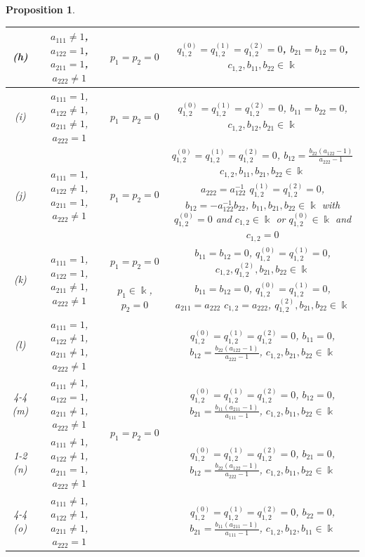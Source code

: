 \documentclass{amsart}
\newtheorem{proposition}[theorem]{Proposition}
\theoremstyle{definition}
\theoremstyle{remark}
\numberwithin{equation}{section}
\begin{document}
\begin{proposition}
\begin{table}[h]
\begin{center}
{\begin{tabular}{ |c|c|c|c| }
\hline
{\rm (h)} & $a_{111}\not =1$, $a_{122}=1$, $a_{211}=1$, $a_{222}\not=1$ & $p_1=p_2=0$ & $q_{1,2}^{(0)}=q_{1,2}^{(1)}=q_{1,2}^{(2)}=0$, $b_{21}=b_{12}=0$, $c_{1,2}, b_{11}, b_{22}\in\Bbbk$ \\
\hline
{\rm (i)} & $a_{111} =1$, $a_{122}\not=1$, $a_{211}\not=1$, $a_{222}=1$ & $p_1=p_2=0$ & $q_{1,2}^{(0)}=q_{1,2}^{(1)}=q_{1,2}^{(2)}=0$, $b_{11}=b_{22}=0$, $c_{1,2}, b_{12}, b_{21}\in\Bbbk$ \\
\hline
\multirow{2}{*}{{\rm (j)}} & \multirow{2}{*}{$a_{111} =1$, $a_{122}\not=1$, $a_{211}=1$, $a_{222}\not=1$} & \multirow{2}{*}{$p_1=p_2=0$} & $q_{1,2}^{(0)}=q_{1,2}^{(1)}=q_{1,2}^{(2)}=0$, $b_{12}=\frac{b_{22}(a_{122}-1)}{a_{222}-1}$ $c_{1,2}, b_{11}, b_{21}, b_{22}\in\Bbbk$ \\ \cline{4-4}
&  &  & $a_{222}=a_{122}^{-1}$ $q_{1,2}^{(1)}=q_{1,2}^{(2)}=0$, $b_{12}=-a_{122}^{-1}b_{22}$, $b_{11}, b_{21}, b_{22}\in\Bbbk$ with $q_{1,2}^{(0)}=0$ and $c_{1,2}\in\Bbbk$ or $q_{1,2}^{(0)}\in\Bbbk$ and $c_{1,2}=0$ \\   
\hline
\multirow{2}{*}{{\rm (k)}} & \multirow{2}{*}{$a_{111} =1$, $a_{122}=1$, $a_{211}\not=1$, $a_{222}\not=1$} & $p_1=p_2=0$ & $b_{11}=b_{12}=0$, $q_{1,2}^{(0)}=q_{1,2}^{(1)}=0$, $c_{1,2}, q_{1,2}^{(2)}, b_{21}, b_{22}\in\Bbbk$ \\ \cline{3-4}
&  & $p_1\in \Bbbk$, $p_2=0$ & $b_{11}=b_{12}=0$, $q_{1,2}^{(0)}=q_{1,2}^{(1)}=0$, $a_{211}=a_{222}$ $c_{1,2}=a_{222}$, $q_{1,2}^{(2)}, b_{21}, b_{22}\in\Bbbk$ \\   
\hline
{\rm (l)} & $a_{111} =1$, $a_{122}\not=1$, $a_{211}\not=1$, $a_{222}\not=1$ & \multirow{4}{*}{$p_1=p_2=0$} &  $q_{1,2}^{(0)}=q_{1,2}^{(1)}=q_{1,2}^{(2)}=0$, $b_{11}=0$, $b_{12}=\frac{b_{22}(a_{122}-1)}{a_{222}-1}$, $c_{1,2},  b_{21}, b_{22}\in\Bbbk$ \\ \cline{4-4} \cline{1-2}
{\rm (m)} & $a_{111} \not=1$, $a_{122}=1$, $a_{211}\not=1$, $a_{222}\not=1$ &  & $q_{1,2}^{(0)}=q_{1,2}^{(1)}=q_{1,2}^{(2)}=0$, $b_{12}=0$, $b_{21}=\frac{b_{11}(a_{211}-1)}{a_{111}-1}$, $c_{1,2},  b_{11}, b_{22}\in\Bbbk$ \\ \cline{1-2}  \cline{4-4}
{\rm (n)} & $a_{111} \not=1$, $a_{122}\not=1$, $a_{211}=1$, $a_{222}\not=1$ &  & $q_{1,2}^{(0)}=q_{1,2}^{(1)}=q_{1,2}^{(2)}=0$, $b_{21}=0$, $b_{12}=\frac{b_{22}(a_{122}-1)}{a_{222}-1}$, $c_{1,2},  b_{11}, b_{22}\in\Bbbk$ \\   \cline{4-4} \cline{1-2}
{\rm (o)} & $a_{111} \not=1$, $a_{122}\not=1$, $a_{211}\not=1$, $a_{222}=1$ &  & $q_{1,2}^{(0)}=q_{1,2}^{(1)}=q_{1,2}^{(2)}=0$, $b_{22}=0$, $b_{21}=\frac{b_{11}(a_{211}-1)}{a_{111}-1}$, $c_{1,2},  b_{12}, b_{11}\in\Bbbk$ \\ 

\end{tabular}}
\end{center}
\end{table}
\end{proposition}
\end{document}
